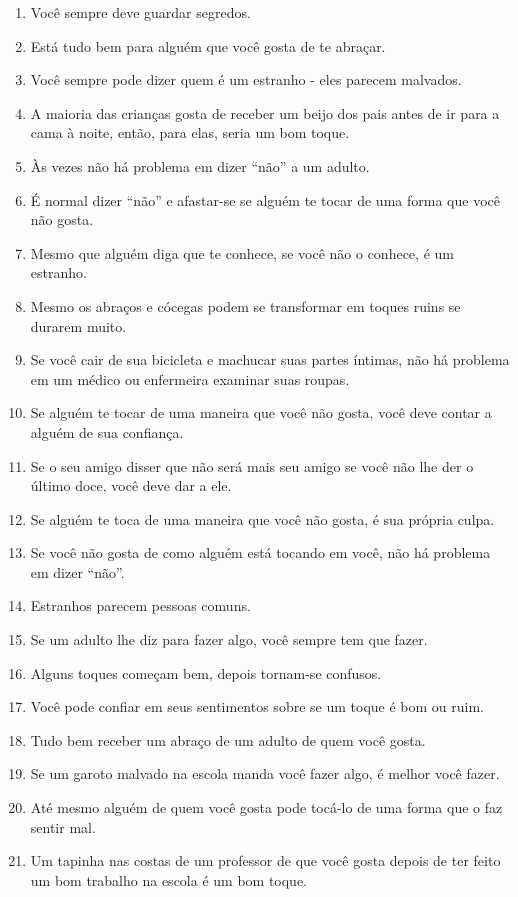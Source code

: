 \begin{enumerate}
	\item Você sempre deve guardar segredos.
	\item Está tudo bem para alguém que você gosta de te abraçar.
	\item Você sempre pode dizer quem é um estranho - eles parecem malvados.
	\item A maioria das crianças gosta de receber um beijo dos pais antes de ir para a cama à noite, então, para elas, seria um bom toque.
	\item Às vezes não há problema em dizer ``não'' a um adulto.
	\item É normal dizer ``não'' e afastar-se se alguém te tocar de uma forma que você não gosta.
	\item Mesmo que alguém diga que te conhece, se você não o conhece, é um estranho.
	\item Mesmo os abraços e cócegas podem se transformar em toques ruins se durarem muito.
	\item Se você cair de sua bicicleta e machucar suas partes íntimas, não há problema em um médico ou enfermeira examinar suas roupas.
	\item Se alguém te tocar de uma maneira que você não gosta, você deve contar a alguém de sua confiança.
	\item Se o seu amigo disser que não será mais seu amigo se você não lhe der o último doce, você deve dar a ele.
	\item Se alguém te toca de uma maneira que você não gosta, é sua própria culpa.
	\item Se você não gosta de como alguém está tocando em você, não há problema em dizer ``não''.
	\item Estranhos parecem pessoas comuns.
	\item Se um adulto lhe diz para fazer algo, você sempre tem que fazer.
	\item Alguns toques começam bem, depois tornam-se confusos.
	\item Você pode confiar em seus sentimentos sobre se um toque é bom ou ruim.
	\item Tudo bem receber um abraço de um adulto de quem você gosta.
	\item Se um garoto malvado na escola manda você fazer algo, é melhor você fazer.
	\item Até mesmo alguém de quem você gosta pode tocá-lo de uma forma que o faz sentir mal.
	\item Um tapinha nas costas de um professor de que você gosta depois de ter feito um bom trabalho na escola é um bom toque.

\end{enumerate}
